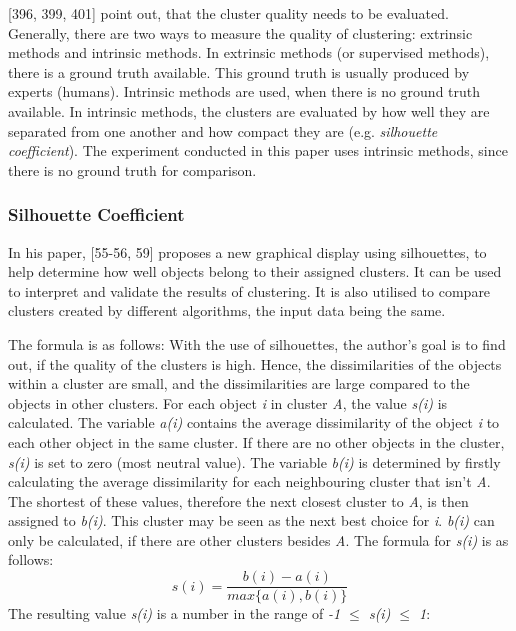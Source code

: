  \textcite{han2011data}[396, 399, 401] point out, that the cluster quality needs to be evaluated. Generally, there are two ways to measure the quality of clustering: extrinsic methods and intrinsic methods. In extrinsic methods (or supervised methods), there is a ground truth available. This ground truth is usually produced by experts (humans). Intrinsic methods are used, when there is no ground truth available. In intrinsic methods, the clusters are evaluated by how well they are separated from one another and how compact they are (e.g. \textit{silhouette coefficient}). The experiment conducted in this paper uses intrinsic methods, since there is no ground truth for comparison.

\subsubsection{Silhouette Coefficient}
\label{section:silhouetteCoefficient}
In his paper, \textcite{rousseeuw1987silhouettes}[55-56, 59] proposes a new graphical display using silhouettes, to help determine how well objects belong to their assigned clusters. It can be used to interpret and validate the results of clustering. It is also utilised to compare clusters created by different algorithms, the input data being the same.

The formula is as follows:
With the use of silhouettes, the author's goal is to find out, if the quality of the clusters is high. Hence, the dissimilarities of the objects within a cluster are small, and the dissimilarities are large compared to the objects in other clusters. For each object \textit{i} in cluster \textit{A}, the value \textit{s(i)} is calculated. The variable \textit{a(i)} contains the average dissimilarity of the object \textit{i} to each other object in the same cluster. If there are no other objects in the cluster, \textit{s(i)} is set to zero (most neutral value). The variable \textit{b(i)} is determined by firstly calculating the average dissimilarity for each neighbouring cluster that isn't \textit{A}. The shortest of these values, therefore the next closest cluster to \textit{A}, is then assigned to \textit{b(i)}. This cluster may be seen as the next best choice for \textit{i}. \textit{b(i)} can only be calculated, if there are other clusters besides \textit{A}. The formula for \textit{s(i)} is as follows:
\[
  s(i) = \frac{b(i) - a(i)}{max\{a(i), b(i)\}}  
\]
The resulting value \textit{s(i)} is a number in the range of \textit{-1 $\leq$ \textit{s(i)} $\leq$ 1}:

